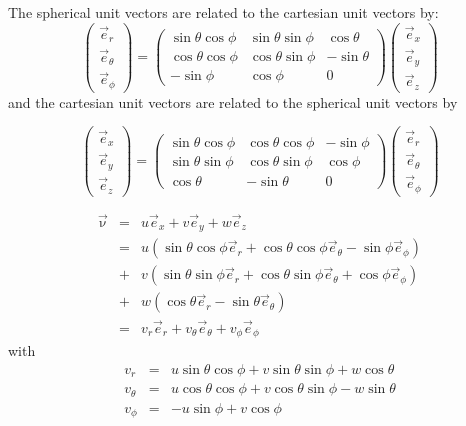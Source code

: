 The spherical unit vectors are related to the cartesian unit vectors by:
\[
\left(
\begin{array}{c}
\vec{e}_{r} \\ \vec{e}_\theta \\ \vec{e}_\phi
\end{array}
\right)
=
\left(
\begin{array}{ccc}
\sin\theta \cos\phi & \sin\theta\sin\phi & \cos\theta  \\
\cos\theta \cos\phi & \cos\theta\sin\phi & -\sin\theta \\
-\sin\phi & \cos\phi & 0
\end{array}
\right)
\left(
\begin{array}{c}
\vec{e}_{x} \\ \vec{e}_y \\ \vec{e}_z
\end{array}
\right)
\]
and the cartesian unit vectors are related to the spherical unit vectors by

\[
\left(
\begin{array}{c}
\vec{e}_{x} \\ \vec{e}_y \\ \vec{e}_z
\end{array}
\right)
=
\left(
\begin{array}{ccc}
\sin\theta \cos\phi & \cos\theta\cos\phi & -\sin\phi  \\
\sin\theta \sin\phi & \cos\theta\sin\phi & \cos\phi \\
\cos\theta & -\sin\theta & 0
\end{array}
\right)
\left(
\begin{array}{c}
\vec{e}_{r} \\ \vec{e}_\theta \\ \vec{e}_\phi
\end{array}
\right)
\]

\begin{eqnarray}
\vec{\upnu} 
&=& u \vec{e}_x + v \vec{e}_y + w \vec{e}_z \\
&=& u ( \sin\theta \cos\phi \vec{e}_r +  \cos\theta\cos\phi \vec{e}_{\theta} -\sin\phi \vec{e}_{\phi} ) \\
&+& v ( \sin\theta \sin\phi \vec{e}_r + \cos\theta\sin\phi \vec{e}_\theta  +  \cos\phi \vec{e}_\phi  )  \\
&+& w ( \cos\theta \vec{e}_r   -\sin\theta \vec{e}_\theta  ) \\
&=& v_r \vec{e}_r + v_\theta \vec{e}_\theta + v_\phi \vec{e}_\phi 
\end{eqnarray}
with 
\begin{eqnarray}
v_r      &=&  u \sin \theta  \cos \phi  + v \sin\theta \sin \phi + w \cos\theta \\
v_\theta &=&  u \cos\theta\cos\phi + v \cos\theta\sin\phi -w \sin\theta   \\
v_\phi   &=& -u \sin\phi  + v \cos\phi  
\end{eqnarray}


